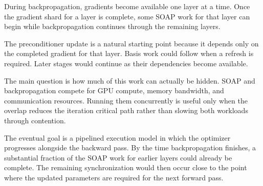 \documentclass[11pt]{article}
\begin{document}
During backpropagation, gradients become available one layer at a time. Once the gradient shard for a layer is complete, some SOAP work for that layer can begin while backpropagation continues through the remaining layers.

The preconditioner update is a natural starting point because it depends only on the completed gradient for that layer. Basis work could follow when a refresh is required. Later stages would continue as their dependencies become available.

The main question is how much of this work can actually be hidden. SOAP and backpropagation compete for GPU compute, memory bandwidth, and communication resources. Running them concurrently is useful only when the overlap reduces the iteration critical path rather than slowing both workloads through contention.

The eventual goal is a pipelined execution model in which the optimizer progresses alongside the backward pass. By the time backpropagation finishes, a substantial fraction of the SOAP work for earlier layers could already be complete. The remaining synchronization would then occur close to the point where the updated parameters are required for the next forward pass.



\end{document}
